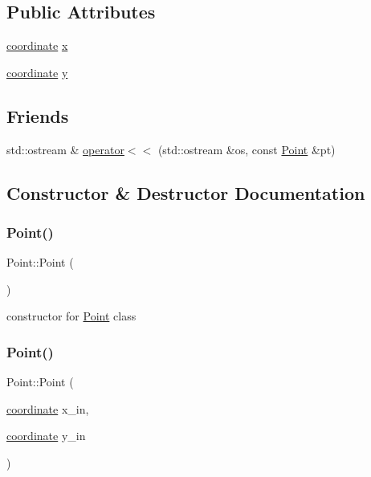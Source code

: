 \subsection*{Public Attributes}
\begin{DoxyCompactItemize}
\item 
\mbox{\hyperlink{primitives_8h_a9949b5198385a93773b854932cb22e08}{coordinate}} \mbox{\hyperlink{class_point_a2e5bf2da8d7f35ef2ca707ae5ec1929b}{x}}
\item 
\mbox{\hyperlink{primitives_8h_a9949b5198385a93773b854932cb22e08}{coordinate}} \mbox{\hyperlink{class_point_a4390d37c7ed19ad07212fc84df2fe26e}{y}}
\end{DoxyCompactItemize}
\subsection*{Friends}
\begin{DoxyCompactItemize}
\item 
std\+::ostream \& \mbox{\hyperlink{class_point_a2c120859855730a5ff9d2eaee48471c5}{operator$<$$<$}} (std\+::ostream \&os, const \mbox{\hyperlink{class_point}{Point}} \&pt)
\end{DoxyCompactItemize}


\subsection{Constructor \& Destructor Documentation}
\mbox{\label{class_point_ad92f2337b839a94ce97dcdb439b4325a}} 
\subsubsection{\texorpdfstring{Point()}{Point()}\hspace{0.1cm}{\footnotesize\ttfamily [1/2]}}
{\footnotesize\ttfamily Point\+::\+Point (\begin{DoxyParamCaption}{ }\end{DoxyParamCaption})}

constructor for \mbox{\hyperlink{class_point}{Point}} class \mbox{\label{class_point_af7373698b9fafc53b0a5d06e511642e1}} 
\subsubsection{\texorpdfstring{Point()}{Point()}\hspace{0.1cm}{\footnotesize\ttfamily [2/2]}}
{\footnotesize\ttfamily Point\+::\+Point (\begin{DoxyParamCaption}\item[{\mbox{\hyperlink{primitives_8h_a9949b5198385a93773b854932cb22e08}{coordinate}}}]{x\+\_\+in,  }\item[{\mbox{\hyperlink{primitives_8h_a9949b5198385a93773b854932cb22e08}{coordinate}}}]{y\+\_\+in }\end{DoxyParamCaption})}

